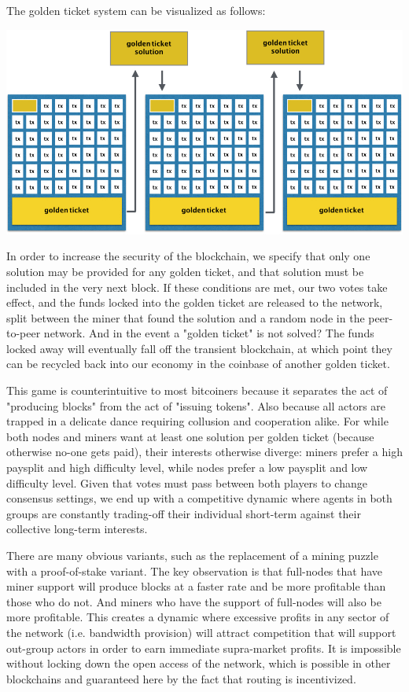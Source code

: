 \documentclass[11.5pt, oneside]{article}   	%
\begin{document}
\begin{multicols}{2}
The golden ticket system can be visualized as follows:

\includegraphics[width=.45\textwidth]{saito7.jpeg}

In order to increase the security of the blockchain, we specify that only one solution may be provided for any golden ticket, and that solution must be included in the very next block. If these conditions are met, our two votes take effect, and the funds locked into the golden ticket are released to the network, split between the miner that found the solution and a random node in the peer-to-peer network. And in the event a "golden ticket" is not solved? The funds locked away will eventually fall off the transient blockchain, at which point they can be recycled back into our economy in the coinbase of another golden ticket. 

This game is counterintuitive to most bitcoiners because it separates the act of "producing blocks" from the act of "issuing tokens". Also because all actors are trapped in a delicate dance requiring collusion and cooperation alike. For while both nodes and miners want at least one solution per golden ticket (because otherwise no-one gets paid), their interests otherwise diverge: miners prefer a high paysplit and high difficulty level, while nodes prefer a low paysplit and low difficulty level. Given that votes must pass between both players to change consensus settings, we end up with a competitive dynamic where agents in both groups are constantly trading-off their individual short-term against their collective long-term interests.

There are many obvious variants, such as the replacement of a mining puzzle with a proof-of-stake variant. The key observation is that full-nodes that have miner support will produce blocks at a faster rate and be more profitable than those who do not. And miners who have the support of full-nodes will also be more profitable. This creates a dynamic where excessive profits in any sector of the network (i.e. bandwidth provision) will attract competition that will support out-group actors in order to earn immediate supra-market profits. It is impossible without locking down the open access of the network, which is possible in other blockchains and guaranteed here by the fact that routing is incentivized.


\end{multicols}
\end{document}
